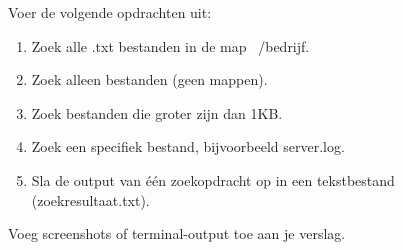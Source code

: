 Voer de volgende opdrachten uit:
\begin{enumerate}
\item Zoek alle .txt bestanden in de map ~/bedrijf.
\item Zoek alleen bestanden (geen mappen).
\item Zoek bestanden die groter zijn dan 1KB.
\item Zoek een specifiek bestand, bijvoorbeeld server.log.
\item Sla de output van één zoekopdracht op in een tekstbestand (zoekresultaat.txt).
\end{enumerate}

Voeg screenshots of terminal-output toe aan je verslag.

